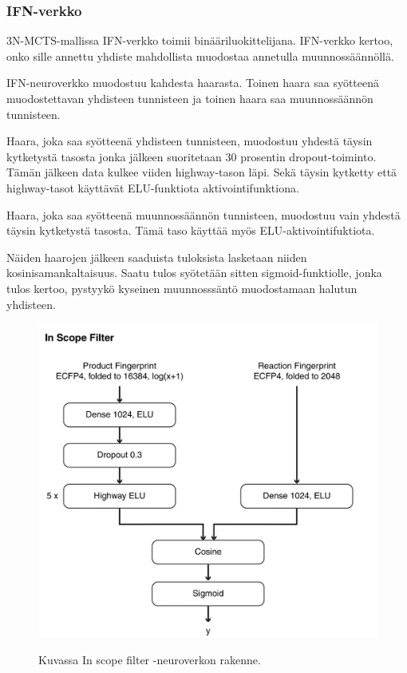 \documentclass[finnish,twoside,censored,tkt,sw-line]{HYthesisML}
\begin{document}
\subsubsection{IFN-verkko}

3N-MCTS-mallissa IFN-verkko toimii binääriluokittelijana.
IFN-verkko kertoo, onko sille annettu yhdiste mahdollista muodostaa annetulla muunnossäännöllä.

IFN-neuroverkko muodostuu kahdesta haarasta.
Toinen haara saa syötteenä muodostettavan yhdisteen tunnisteen ja toinen haara saa muunnossäännön tunnisteen.

Haara, joka saa syötteenä yhdisteen tunnisteen, muodostuu yhdestä täysin kytketystä tasosta jonka jälkeen suoritetaan 30 prosentin dropout-toiminto.
Tämän jälkeen data kulkee viiden highway-tason läpi.
Sekä täysin kytketty että highway-tasot käyttävät ELU-funktiota aktivointifunktiona.

Haara, joka saa syötteenä muunnossäännön tunnisteen, muodostuu vain yhdestä täysin kytketystä tasosta.
Tämä taso käyttää myös ELU-aktivointifuktiota.

Näiden haarojen jälkeen saaduista tuloksista lasketaan niiden kosinisamankaltaisuus.
Saatu tulos syötetään sitten sigmoid-funktiolle, jonka tulos kertoo, pystyykö kyseinen muunnosssäntö muodostamaan halutun yhdisteen.

\begin{figure}[!ht]
    \centering
    \includegraphics[]{in-scope-filter.jpg}
    \caption{Kuvassa In scope filter -neuroverkon rakenne.}
    {\cite{SeglerMarwinHS2018Pcsw}}
    {\label{fig:3n-mcts-ifn}}
\end{figure}
\end{document}
